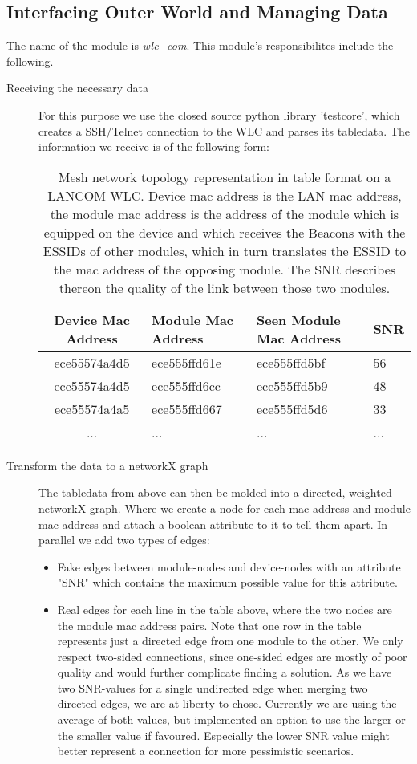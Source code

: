   \subsection{Interfacing Outer World and Managing Data}
    The name of the module is \textit{wlc\_com}. This module's responsibilites include the following.
    \begin{description}
    \item[Receiving the necessary data]
      For this purpose we use the closed source python library 'testcore', which creates a SSH/Telnet connection to the WLC and parses its tabledata.
      The information we receive is of the following form:
      \begin{table}[p]
	\begin{tabular}{clll}
	  Device Mac Address & Module Mac Address & Seen Module Mac Address & \ac{SNR}\\ \hline
	  ece55574a4d5 & ece555ffd61e & ece555ffd5bf & 56 \\
	  ece55574a4d5 & ece555ffd6cc & ece555ffd5b9 & 48 \\
	  ece55574a4a5 & ece555ffd667 & ece555ffd5d6 & 33 \\
	  ... & ... & ... & ...
	\end{tabular}
	\caption{Mesh network topology representation in table format on a LANCOM WLC. Device mac address is the LAN mac address, the module mac address is
	the address of the module which is equipped on the device and which receives the Beacons with the ESSIDs of other modules, which in turn translates
	the ESSID to the mac address of the opposing module. The \ac{SNR} describes thereon the quality of the link between those two modules.}
	\label{tab:wlc}
      \end{table}
      
      \item [Transform the data to a networkX graph]
	The tabledata from above can then be molded into a directed, weighted networkX graph. Where we create a node for each mac address and module mac address and attach a boolean
	attribute to it to tell them apart. 
	In parallel we add two types of edges:
      
	\begin{itemize}
	  \item Fake edges between module-nodes and device-nodes with an attribute "SNR" which contains the maximum possible value for this attribute.
	  
	  \item Real edges for each line in the table above, where the two nodes are the module mac address pairs. 
	    Note that one row in the table represents just a directed edge from one module to the other. We only respect two-sided connections,
	    since one-sided edges are mostly of poor quality and would further complicate finding a solution.
	    As we have two SNR-values for a single undirected edge when merging two directed edges, we are at liberty to chose.
	    Currently we are using the average of both values, but implemented an option to use the larger or the smaller value if favoured.
	    Especially the lower SNR value might better represent a connection for more pessimistic scenarios.
	\end{itemize}
      

\end{description}
